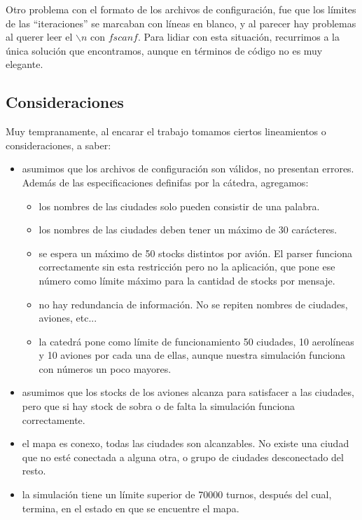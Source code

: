 \documentclass[a4paper,10pt]{article}
\begin{document}
Otro problema con el formato de los archivos de configuración, fue que los límites de las ``iteraciones'' se marcaban con líneas en blanco, y al parecer hay 
problemas al querer leer el $\backslash n$ con $fscanf$. Para lidiar con esta situación, recurrimos a la única solución que encontramos, aunque en términos de 
código no es muy elegante.\\

\subsection{Consideraciones}

Muy tempranamente, al encarar el trabajo tomamos ciertos lineamientos o consideraciones, a saber:

\begin{itemize}
  \item asumimos que los archivos de configuración son válidos, no presentan errores. Además de las especificaciones definifas por la cátedra, agregamos:
	\begin{itemize}
	      \item los nombres de las ciudades solo pueden consistir de una palabra.
	      \item los nombres de las ciudades deben tener un máximo de 30 carácteres.
	      \item se espera un máximo de 50 stocks distintos por avión. El parser funciona correctamente sin esta restricción pero no la aplicación, que 
		    pone ese número como límite máximo para la cantidad de stocks por mensaje.
	      \item no hay redundancia de información. No se repiten nombres de ciudades, aviones, etc...
	      \item la catedrá pone como límite de funcionamiento 50 ciudades, 10 aerolíneas y 10 aviones por cada una de ellas, aunque nuestra simulación 
		    funciona con números un poco mayores.
	\end{itemize}
  \item asumimos que los stocks de los aviones alcanza para satisfacer a las ciudades, pero que si hay stock de sobra o de falta la simulación 
	funciona correctamente. 
  \item el mapa es conexo, todas las ciudades son alcanzables. No existe una ciudad que no esté conectada a alguna otra, o grupo de ciudades 
	desconectado del resto.
  \item la simulación tiene un límite superior de 70000 turnos, después del cual, termina, en el estado en que se encuentre el mapa.
\end{itemize}
\end{document}

